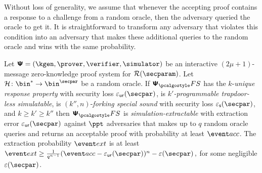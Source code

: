 Without loss of generality, we assume that whenever the accepting proof contains
a response to a challenge from a random oracle, then the adversary queried the
oracle to get it. It is straightforward to transform any adversary that violates
this condition into an adversary that makes these additional queries to the
random oracle and wins with the same probability.


\begin{theorem}
  \label{thm:se}
  Let $\ps = (\kgen, \prover, \verifier, \simulator)$ be an interactive
  $(2 \mu + 1)$-message zero-knowledge proof system for $\RELGEN(\secparam)$. Let
  $\ro\colon \bin^{*} \to \bin^{\secpar}$ be a random oracle. If $\psfs$ has the
  $k$-\emph{unique response property} with security loss $\epsur(\secpar)$, is
  \emph{$k'$-programmable trapdoor-less simulatable}, is $(k'', n)$-\emph{forking
    special sound} with security loss $\epss(\secpar)$, and $k \geq k' \geq k''$ then
  $\psfs$ is \emph{simulation-extractable} with extraction error $\epsur(\secpar)$
  against $\ppt$ adversaries that makes up to $q$ random oracle queries and returns
  an acceptable proof with probability at least $\accProb$.  The extraction
  probability $\extProb$ is at least
  \( \extProb \geq \frac{1}{q^{n - 1}} (\accProb - \epsur(\secpar))^{n}
  -\eps(\secpar)\,, \) for some negligible $\eps(\secpar)$.
\end{theorem}
